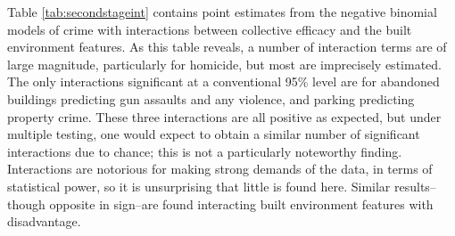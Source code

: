 \documentclass [11pt, proquest] {uwthesis}[2015/03/03]
\begin{document}
\begin{longtable}[c]{|p{0.10in}|p{0.80in}|p{0.75in}|p{0.75in}|p{0.75in}|p{0.75in}|p{0.75in}}
Modern Roman})}}} & \multicolumn{1}{!{\color[HTML]{000000}\vrule width 0pt}>{\centering}p{\dimexpr 0.75in+0\tabcolsep+0\arrayrulewidth}}{\fontsize{10}{10}\selectfont{\textcolor[HTML]{000000}{\global\setmainfont{Latin Modern Roman}-0.03}}\fontsize{10}{10}\selectfont{\textcolor[HTML]{000000}{\global\setmainfont{Latin Modern Roman}\linebreak }}\fontsize{10}{10}\selectfont{\textcolor[HTML]{000000}{\global\setmainfont{Latin Modern Roman}(}}\fontsize{10}{10}\selectfont{\textcolor[HTML]{000000}{\global\setmainfont{Latin Modern Roman}0.03}}\fontsize{10}{10}\selectfont{\textcolor[HTML]{000000}{\global\setmainfont{Latin Modern Roman})}}} & \multicolumn{1}{!{\color[HTML]{000000}\vrule width 0pt}>{\centering}p{\dimexpr 0.75in+0\tabcolsep+0\arrayrulewidth}!{\color[HTML]{000000}\vrule width 0pt}}{\fontsize{10}{10}\selectfont{\textcolor[HTML]{000000}{\global\setmainfont{Latin Modern Roman}-0.03}}\fontsize{10}{10}\selectfont{\textcolor[HTML]{000000}{\global\setmainfont{Latin Modern Roman}\linebreak }}\fontsize{10}{10}\selectfont{\textcolor[HTML]{000000}{\global\setmainfont{Latin Modern Roman}(}}\fontsize{10}{10}\selectfont{\textcolor[HTML]{000000}{\global\setmainfont{Latin Modern Roman}0.02}}\fontsize{10}{10}\selectfont{\textcolor[HTML]{000000}{\global\setmainfont{Latin Modern Roman})}}} \\

\noalign{\global\setlength{\arrayrulewidth}{0.5pt}}\arrayrulecolor[HTML]{000000}\cline{1-7}

\end{longtable}
Table \ref{tab:secondstageint} contains point estimates from the negative binomial models of crime with interactions between collective efficacy and the built environment features. As this table reveals, a number of interaction terms are of large magnitude, particularly for homicide, but most are imprecisely estimated. The only interactions significant at a conventional 95\% level are for abandoned buildings predicting gun assaults and any violence, and parking predicting property crime. These three interactions are all positive as expected, but under multiple testing, one would expect to obtain a similar number of significant interactions due to chance; this is not a particularly noteworthy finding. Interactions are notorious for making strong demands of the data, in terms of statistical power, so it is unsurprising that little is found here. Similar results--though opposite in sign--are found interacting built environment features with disadvantage.
\end{document}
